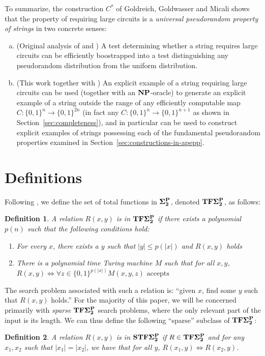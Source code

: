 \documentclass[11pt]{article}
\newtheorem{definition}{Definition}
\def\cl{\bf}
\begin{document}
To summarize, the construction $C^*$ of Goldreich, Goldwasser and Micali shows that the property of requiring large circuits is a \emph{universal pseudorandom property of strings} in two concrete senses: 
\begin{enumerate}[(a)]
    \item (Original analysis of \cite{GGM} and \cite{natural-proofs}) A test determining whether a string requires large circuits can be efficiently boostrapped into a test distinguishing any pseudorandom distribution from the uniform distribution.
    \item (This work together with \cite{Jerabek}) An explicit example of a string requiring large circuits can be used (together with an $\cl{NP}$-oracle) to generate an explicit example of a string outside the range of any efficiently computable map $C: \{0,1\}^n \rightarrow \{0,1\}^{2n}$ (in fact any $C: \{0,1\}^n \rightarrow \{0,1\}^{n+1}$ as shown in Section~\ref{sec:completeness}), and in particular can be used to construct explicit examples of strings possessing each of the fundamental pseudorandom properties examined in Section~\ref{sec:constructions-in-apepp}.
\end{enumerate}

\section{Definitions}\label{sec:defs}
 Following \cite{total}, we define the set of total functions in ${\cl \Sigma_2^P}$, denoted ${\cl TF\Sigma_2^P}$, as follows:
\begin{definition}
A relation $R(x,y)$ is in ${\cl TF\Sigma_2^P}$ if there exists a polynomial $p(n)$ such that the following conditions hold:
\begin{enumerate}
    \item For every $x$, there exists a $y$ such that $|y| \leq p(|x|)$ and $R(x,y)$ holds
    \item There is a polynomial time Turing machine $M$ such that for all $x,y$, \\
    $R(x,y) \Longleftrightarrow \forall z \in \{0,1\}^{p(|x|)} M(x,y,z) \text{ accepts}$ 
\end{enumerate}
\end{definition}
The search problem associated with such a relation is: ``given $x$, find some $y$ such that $R(x,y)$ holds.'' For the majority of this paper, we will be concerned primarily with \emph{sparse} ${\cl TF\Sigma_2^P}$ search problems, where the only relevant part of the input is its length. We can thus define the following ``sparse'' subclass of ${\cl TF\Sigma_2^P}$: 
\begin{definition}
A relation $R(x,y)$ is in ${\cl STF\Sigma_2^P}$ if $R \in {\cl TF\Sigma_2^P}$ and for any $x_1,x_2$ such that $|x_1|=|x_2|$, we have that for all $y$, $R(x_1,y) \Leftrightarrow R(x_2,y)$.
\end{definition}
\end{document}
